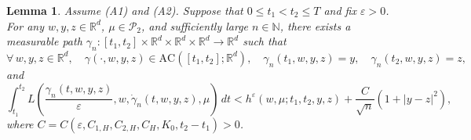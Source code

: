 \documentclass[reqno,11pt]{amsart}
\newtheorem{lemma}[theorem]{Lemma}
\numberwithin{equation}{section}
\newcommand{\R}{\mathbb{R}} %
\newcommand{\e}{\varepsilon}
\newcommand{\ep}{\varepsilon}
\begin{document}



\begin{lemma}\label{lem:measapp}
Assume (A1) and (A2). Suppose that \(0\leq t_1<t_2\leq T\) and fix \(\varepsilon>0\). For any $w,y,z \in \R^d$, $\mu \in \mathcal{P}_2$, and sufficiently large $n\in \mathbb{N}$, there exists a measurable path $\gamma_n:[t_1,t_2]\times\mathbb{R}^d \times\mathbb{R}^d \times\mathbb{R}^d\to\mathbb{R}^d$ such that
\[
\forall \, w,y,z \in \R^d,\quad \gamma(\cdot, w,y,z) \in \mathrm{AC}([t_1,t_2];\R^d),\quad \gamma_n(t_1,w,y,z)=y, \quad \gamma_n(t_2,w,y,z)=z,
\]
and
\[
\int_{t_1}^{t_2}
L \left(\frac{\gamma_n(t,w,y,z)}{\varepsilon}, w, \dot{\gamma}_n(t,w,y,z),\mu\right)\,dt
<
h^\e\left(w,\mu;t_1, t_2, y, z\right)+\frac{C}{\sqrt{n}}\left(1+|y-z|^2\right),
\]
where $C=C(\ep,C_{1,H}, C_{2, H}, C_H, K_0, t_2-t_1)>0$.
\end{lemma}
\end{document}

